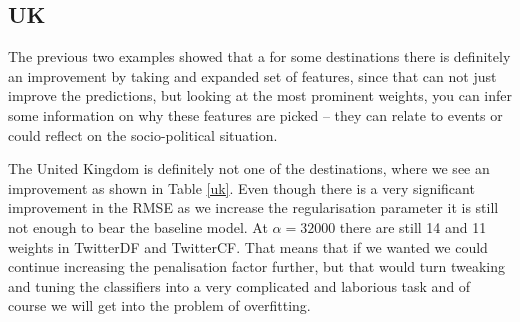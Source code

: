 \documentclass[minf,twoside,singlespacing,parskip,frontabs]{infthesis}
\begin{document}
\newpage
\subsection{UK}

The previous two examples showed that a for some destinations there is definitely an improvement by taking and expanded set of features, since that can not just improve the predictions, but looking at the most prominent weights, you can infer some information on why these features are picked -- they can relate to events or could reflect on the socio-political situation. 

The United Kingdom is definitely not one of the destinations, where we see an improvement as shown in Table \ref{uk}.  Even though there is a very significant improvement in the RMSE as we increase the regularisation parameter it is still not enough to bear the baseline model. At $\alpha=32000$ there are still 14 and 11 weights in TwitterDF and TwitterCF. That means that if we wanted we could continue increasing the penalisation factor further, but that would turn tweaking and tuning the classifiers into a very complicated and laborious task and of course we will get into the problem of overfitting.
\end{document}
